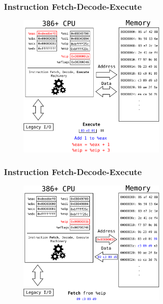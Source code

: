 \documentclass[11pt,xcolor=dvipsnames]{beamer}
\newcommand{\mvs}{\vspace{-0.95em}}
\begin{document}
\begin{frame}[fragile,t]
\frametitle{Instruction Fetch-Decode-Execute}
\mvs
\begin{figure}
\centering \includegraphics[width=0.65\textwidth]{figures/386fetch_decode_execute3.png}
\end{figure}
\end{frame}

\begin{frame}[fragile,t]
\frametitle{Instruction Fetch-Decode-Execute}
\mvs
\begin{figure}
\centering \includegraphics[width=0.65\textwidth]{figures/386fetch_decode_execute4.png}
\end{figure}
\end{frame}
\end{document}
